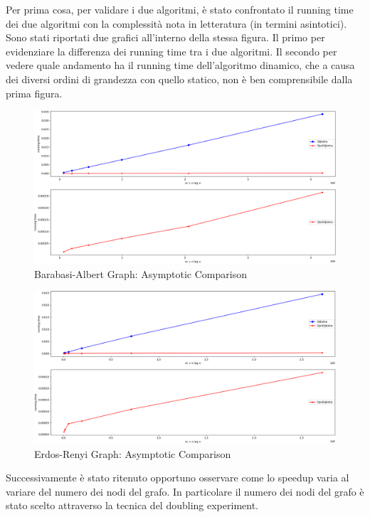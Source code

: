\documentclass[a4paper]{article}
\begin{document}
Per prima cosa, per validare i due algoritmi, è stato confrontato il running time dei due algoritmi con la complessità nota in letteratura (in termini asintotici).
Sono stati riportati due grafici all'interno della stessa figura. Il primo per evidenziare la differenza dei running time tra i due algoritmi. Il secondo per vedere quale andamento ha il running time dell'algoritmo dinamico, che a causa dei diversi ordini di grandezza con quello statico, non è ben comprensibile dalla prima figura.
\begin{figure}[!h]
\includegraphics[scale=0.29]{img/BAG_F1_ExpectedAsymptotic-RunningTime}
\centering
\caption{Barabasi-Albert Graph: Asymptotic Comparison}
\end{figure}
\begin{figure}[!h]
\includegraphics[scale=0.29]{img/ERG_F1_ExpectedAsymptotic-RunningTime}
\centering
\caption{Erdos-Renyi Graph: Asymptotic Comparison}
\end{figure}
\newpage
Successivamente è stato ritenuto opportuno osservare come lo speedup varia al variare del numero dei nodi del grafo. In particolare il numero dei nodi del grafo è stato scelto attraverso la tecnica del doubling experiment.
\end{document}
